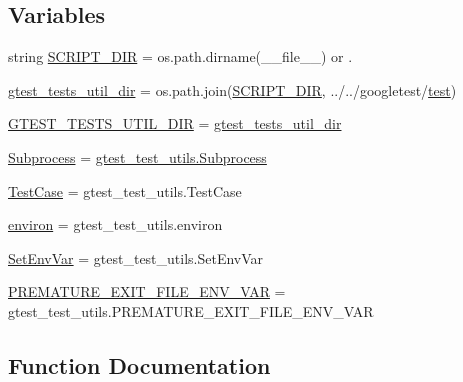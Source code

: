 \subsection*{Variables}
\begin{DoxyCompactItemize}
\item 
string \mbox{\hyperlink{namespacetest_1_1gmock__test__utils_acd989690af295e96f085e0495b7d534a}{S\+C\+R\+I\+P\+T\+\_\+\+D\+IR}} = os.\+path.\+dirname(\+\_\+\+\_\+file\+\_\+\+\_\+) or \textquotesingle{}.\textquotesingle{}
\item 
\mbox{\hyperlink{namespacetest_1_1gmock__test__utils_ab9f899d331de99dc5ce7000301189a8d}{gtest\+\_\+tests\+\_\+util\+\_\+dir}} = os.\+path.\+join(\mbox{\hyperlink{namespacetest_1_1gmock__test__utils_acd989690af295e96f085e0495b7d534a}{S\+C\+R\+I\+P\+T\+\_\+\+D\+IR}}, \textquotesingle{}../../googletest/\mbox{\hyperlink{_mutual_8h_a707ee03719e99670bf6cfdfd897b8456}{test}}\textquotesingle{})
\item 
\mbox{\hyperlink{namespacetest_1_1gmock__test__utils_a4af656b46dfb5a02a61293b7b671b4ce}{G\+T\+E\+S\+T\+\_\+\+T\+E\+S\+T\+S\+\_\+\+U\+T\+I\+L\+\_\+\+D\+IR}} = \mbox{\hyperlink{namespacetest_1_1gmock__test__utils_ab9f899d331de99dc5ce7000301189a8d}{gtest\+\_\+tests\+\_\+util\+\_\+dir}}
\item 
\mbox{\hyperlink{namespacetest_1_1gmock__test__utils_ada86bbfe3546e4e5385e6853f02bfb0a}{Subprocess}} = \mbox{\hyperlink{classgtest__test__utils_1_1_subprocess}{gtest\+\_\+test\+\_\+utils.\+Subprocess}}
\item 
\mbox{\hyperlink{namespacetest_1_1gmock__test__utils_a214cc134d9549508e3d4cebdd7de0741}{Test\+Case}} = gtest\+\_\+test\+\_\+utils.\+Test\+Case
\item 
\mbox{\hyperlink{namespacetest_1_1gmock__test__utils_a043a2edfb6718610cf223c9e806a2e29}{environ}} = gtest\+\_\+test\+\_\+utils.\+environ
\item 
\mbox{\hyperlink{namespacetest_1_1gmock__test__utils_a312cebe51380cf393a9797f650dd853d}{Set\+Env\+Var}} = gtest\+\_\+test\+\_\+utils.\+Set\+Env\+Var
\item 
\mbox{\hyperlink{namespacetest_1_1gmock__test__utils_ac1f6d47df21860ecaacdd24cc4bee801}{P\+R\+E\+M\+A\+T\+U\+R\+E\+\_\+\+E\+X\+I\+T\+\_\+\+F\+I\+L\+E\+\_\+\+E\+N\+V\+\_\+\+V\+AR}} = gtest\+\_\+test\+\_\+utils.\+P\+R\+E\+M\+A\+T\+U\+R\+E\+\_\+\+E\+X\+I\+T\+\_\+\+F\+I\+L\+E\+\_\+\+E\+N\+V\+\_\+\+V\+AR
\end{DoxyCompactItemize}


\subsection{Function Documentation}
\mbox{\label{namespacetest_1_1gmock__test__utils_a3fbda6599ef677f59ded8d6a617ac1c7}} 
